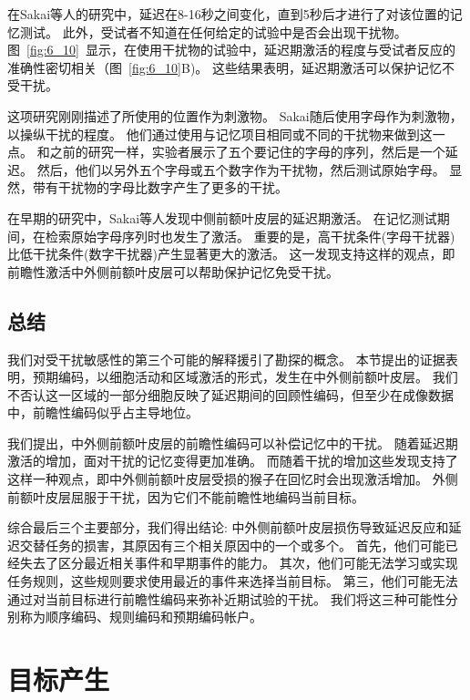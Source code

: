 在Sakai等人\cite{sakai2002active}的研究中，延迟在8-16秒之间变化，直到5秒后才进行了对该位置的记忆测试。
此外，受试者不知道在任何给定的试验中是否会出现干扰物。
图~\ref{fig:6_10}~显示，在使用干扰物的试验中，延迟期激活的程度与受试者反应的准确性密切相关（图~\ref{fig:6_10}B)。
这些结果表明，延迟期激活可以保护记忆不受干扰。


这项研究刚刚描述了所使用的位置作为刺激物。
Sakai\cite{sakai2004prefrontal}随后使用字母作为刺激物，以操纵干扰的程度。
他们通过使用与记忆项目相同或不同的干扰物来做到这一点。
和之前的研究一样，实验者展示了五个要记住的字母的序列，然后是一个延迟。
然后，他们以另外五个字母或五个数字作为干扰物，然后测试原始字母。
显然，带有干扰物的字母比数字产生了更多的干扰。


在早期的研究中，Sakai等人\cite{sakai2002parahippocampal}发现中侧前额叶皮层的延迟期激活。
在记忆测试期间，在检索原始字母序列时也发生了激活。
重要的是，高干扰条件(字母干扰器)比低干扰条件(数字干扰器)产生显著更大的激活。
这一发现支持这样的观点，即前瞻性激活中外侧前额叶皮层可以帮助保护记忆免受干扰。



\subsection{总结}

我们对受干扰敏感性的第三个可能的解释援引了勘探的概念。
本节提出的证据表明，预期编码，以细胞活动和区域激活的形式，发生在中外侧前额叶皮层。
我们不否认这一区域的一部分细胞反映了延迟期间的回顾性编码，但至少在成像数据中，前瞻性编码似乎占主导地位。


我们提出，中外侧前额叶皮层的前瞻性编码可以补偿记忆中的干扰。
随着延迟期激活的增加，面对干扰的记忆变得更加准确。
而随着干扰的增加这些发现支持了这样一种观点，即中外侧前额叶皮层受损的猴子在回忆时会出现激活增加。
外侧前额叶皮层屈服于干扰，因为它们不能前瞻性地编码当前目标。


综合最后三个主要部分，我们得出结论: 中外侧前额叶皮层损伤导致延迟反应和延迟交替任务的损害，其原因有三个相关原因中的一个或多个。
首先，他们可能已经失去了区分最近相关事件和早期事件的能力。
其次，他们可能无法学习或实现任务规则，这些规则要求使用最近的事件来选择当前目标。
第三，他们可能无法通过对当前目标进行前瞻性编码来弥补近期试验的干扰。
我们将这三种可能性分别称为顺序编码、规则编码和预期编码帐户。



\section{目标产生}

